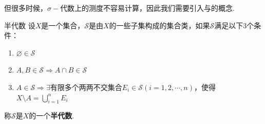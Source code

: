 但很多时候，$\sigma-\text{代数}$上的测度不容易计算，因此我们需要引入与的概念.
\begin{definition}{半代数}
    设$X$是一个集合，$\mathcal{S}$是由$X$的一些子集构成的集合类，如果$\mathcal{S}$满足以下3个条件：
    \begin{enumerate}
        \item $\varnothing\in\mathcal{S}$
        \item $A,B\in\mathcal{S}\Rightarrow A\cap B\in\mathcal{S}$
        \item $A\in\mathcal{S}\Rightarrow \exists\text{有限多个两两不交集合}E_i\in\mathcal{S}(i=1,2,\cdots,n)$，使得$X\setminus A=\bigcup_{i=1}^n{E_i}$
    \end{enumerate}
    称$\mathcal{S}$是$X$的一个\textbf{半代数}.
\end{definition}

